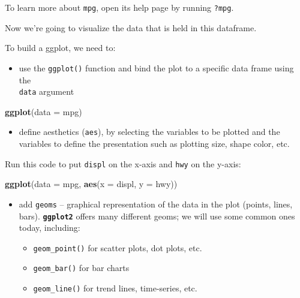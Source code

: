 \documentclass[]{book}
\newenvironment{Shaded}{\begin{snugshade}}{\end{snugshade}}
\newcommand{\KeywordTok}[1]{\textcolor[rgb]{0.13,0.29,0.53}{\textbf{{#1}}}}
\newcommand{\DataTypeTok}[1]{\textcolor[rgb]{0.13,0.29,0.53}{{#1}}}
\newcommand{\NormalTok}[1]{{#1}}
\providecommand{\tightlist}{%
  \setlength{\itemsep}{0pt}\setlength{\parskip}{0pt}}
\theoremstyle{definition}
\theoremstyle{definition}
\theoremstyle{definition}
\theoremstyle{remark}
\begin{document}
To learn more about \texttt{mpg}, open its help page by running
\texttt{?mpg}.

Now we're going to visualize the data that is held in this dataframe.

To build a ggplot, we need to:

\begin{itemize}
\tightlist
\item
  use the \texttt{ggplot()} function and bind the plot to a specific
  data frame using the\\
  \texttt{data} argument
\end{itemize}

\begin{Shaded}
\begin{Highlighting}[]
\KeywordTok{ggplot}\NormalTok{(}\DataTypeTok{data =} \NormalTok{mpg)}
\end{Highlighting}
\end{Shaded}

\begin{itemize}
\tightlist
\item
  define aesthetics (\texttt{aes}), by selecting the variables to be
  plotted and the\\
  variables to define the presentation such as plotting size, shape
  color, etc.
\end{itemize}

Run this code to put \texttt{displ} on the x-axis and \texttt{hwy} on
the y-axis:

\begin{Shaded}
\begin{Highlighting}[]
\KeywordTok{ggplot}\NormalTok{(}\DataTypeTok{data =} \NormalTok{mpg, }\KeywordTok{aes}\NormalTok{(}\DataTypeTok{x =} \NormalTok{displ, }\DataTypeTok{y =} \NormalTok{hwy))}
\end{Highlighting}
\end{Shaded}

\begin{itemize}
\tightlist
\item
  add \texttt{geoms} -- graphical representation of the data in the plot
  (points, lines, bars). \textbf{\texttt{ggplot2}} offers many different
  geoms; we will use some common ones today, including:

  \begin{itemize}
  \tightlist
  \item
    \texttt{geom\_point()} for scatter plots, dot plots, etc.
  \item
    \texttt{geom\_bar()} for bar charts
  \item
    \texttt{geom\_line()} for trend lines, time-series, etc.
  \end{itemize}
\end{itemize}
\end{document}
